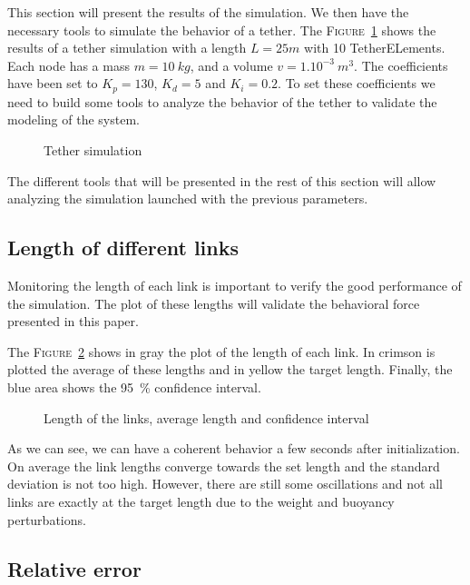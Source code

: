 This section will present the results of the simulation. We then have the necessary tools to simulate the behavior of a tether. The \textsc{Figure}~\ref{fig:simulation} shows the results of a tether simulation with a length $L = 25m$ with 10 TetherELements. Each node has a mass $m=10\ kg$, and a volume $v=1.10^{-3}\ m^3$. The coefficients have been set to $K_p=130$, $K_d=5$ and $K_i=0.2$. To set these coefficients we need to build some tools to analyze the behavior of the tether to validate the modeling of the system.

\begin{figure}[!htb]
    \centering
    \resizebox{0.5\textwidth}{!}{}
    \caption{Tether simulation}
    \label{fig:simulation}
\end{figure}

The different tools that will be presented in the rest of this section will allow analyzing the simulation launched with the previous parameters.

\subsection{Length of different links}

Monitoring the length of each link is important to verify the good performance of the simulation. The plot of these lengths will validate the behavioral force presented in this paper.

The \textsc{Figure}~\ref{fig:length} shows in gray the plot of the length of each link. In crimson is plotted the average of these lengths and in yellow the target length. Finally, the blue area shows the 95~\% confidence interval.

\begin{figure}[!htb]
    \centering
    
    \caption{Length of the links, average length and confidence interval}
    \label{fig:length}
\end{figure}

As we can see, we can have a coherent behavior a few seconds after initialization. On average the link lengths converge towards the set length and the standard deviation is not too high. However, there are still some oscillations and not all links are exactly at the target length due to the weight and buoyancy perturbations.

\subsection{Relative error}

